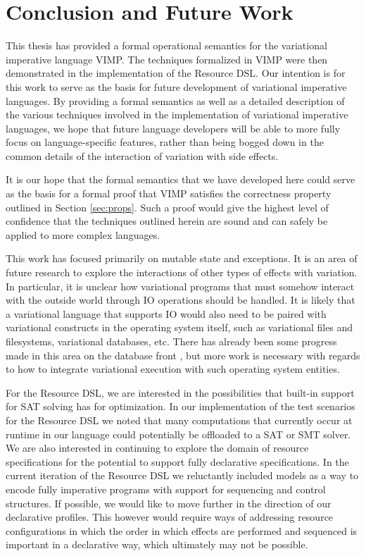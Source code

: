 \documentclass[12pt,oneside]{book}
\begin{document}
\chapter{Conclusion and Future Work}
\label{ch:conc}

This thesis has provided a formal operational semantics for the variational imperative language VIMP.
The techniques formalized in VIMP were then demonstrated in the implementation of the Resource DSL.
Our intention is for this work to serve as the basis for future development of variational imperative languages.
By providing a formal semantics as well as a detailed description of the various techniques involved in the
implementation of variational imperative languages, we hope that future language developers will be able to
more fully focus on language-specific features, rather than being bogged down in the common details of the interaction
of variation with side effects.

It is our hope that the formal semantics that we have developed here
could serve as the basis for a formal proof that VIMP satisfies the correctness property outlined in Section \ref{sec:props}.
Such a proof would give the highest level of confidence that the techniques outlined herein are sound and can safely be
applied to more complex languages.

This work has focused primarily on mutable state and exceptions. It is an area of future research to explore the interactions
of other types of effects with variation. In particular, it is unclear how variational programs that must somehow interact with
the outside world through IO operations should be handled. It is likely that a variational language that supports IO would also
need to be paired with variational constructs in the operating system itself, such as variational files and filesystems, variational
databases, etc. There has already been some progress made in this area on the database front \cite{ATW17dbpl,ATW18poly}, but more work is necessary
with regards to how to integrate variational execution with such operating system entities.

For the Resource DSL, we are interested in the possibilities that built-in support for SAT solving has for optimization.
In our implementation of the test scenarios for the Resource DSL we noted that many computations that currently occur
at runtime in our language could potentially be offloaded to a SAT or SMT solver. We are also interested in continuing to
explore the domain of resource specifications for the potential to support fully declarative specifications. In the current iteration
of the Resource DSL we reluctantly included models as a way to encode fully imperative programs with support for sequencing
and control structures. If possible, we would like to move further in the direction of our declarative profiles. This however would require
ways of addressing resource configurations in which the order in which effects are performed and sequenced is important in a declarative
way, which ultimately may not be possible.

\cleardoublepage



\clearpage\flyleaf
\end{document}
